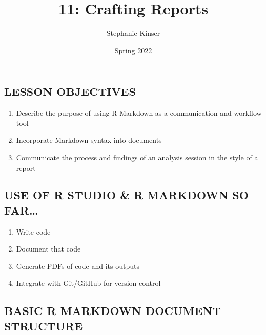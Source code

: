 \documentclass[
]{article}
\title{11: Crafting Reports}
\author{Stephanie Kinser}
\date{Spring 2022}
\providecommand{\tightlist}{%
  \setlength{\itemsep}{0pt}\setlength{\parskip}{0pt}}
\begin{document}
\maketitle

\hypertarget{lesson-objectives}{%
\subsection{LESSON OBJECTIVES}\label{lesson-objectives}}

\begin{enumerate}
\def\labelenumi{\arabic{enumi}.}
\tightlist
\item
  Describe the purpose of using R Markdown as a communication and
  workflow tool
\item
  Incorporate Markdown syntax into documents
\item
  Communicate the process and findings of an analysis session in the
  style of a report
\end{enumerate}

\hypertarget{use-of-r-studio-r-markdown-so-far}{%
\subsection{USE OF R STUDIO \& R MARKDOWN SO
FAR\ldots{}}\label{use-of-r-studio-r-markdown-so-far}}

\begin{enumerate}
\def\labelenumi{\arabic{enumi}.}
\tightlist
\item
  Write code
\item
  Document that code
\item
  Generate PDFs of code and its outputs
\item
  Integrate with Git/GitHub for version control
\end{enumerate}

\hypertarget{basic-r-markdown-document-structure}{%
\subsection{BASIC R MARKDOWN DOCUMENT
STRUCTURE}\label{basic-r-markdown-document-structure}}
\end{document}
